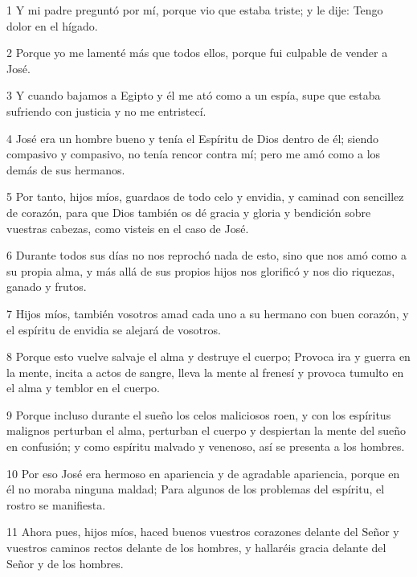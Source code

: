 \par 1 Y mi padre preguntó por mí, porque vio que estaba triste; y le dije: Tengo dolor en el hígado.

\par 2 Porque yo me lamenté más que todos ellos, porque fui culpable de vender a José.

\par 3 Y cuando bajamos a Egipto y él me ató como a un espía, supe que estaba sufriendo con justicia y no me entristecí.

\par 4 José era un hombre bueno y tenía el Espíritu de Dios dentro de él; siendo compasivo y compasivo, no tenía rencor contra mí; pero me amó como a los demás de sus hermanos.

\par 5 Por tanto, hijos míos, guardaos de todo celo y envidia, y caminad con sencillez de corazón, para que Dios también os dé gracia y gloria y bendición sobre vuestras cabezas, como visteis en el caso de José.

\par 6 Durante todos sus días no nos reprochó nada de esto, sino que nos amó como a su propia alma, y ​​más allá de sus propios hijos nos glorificó y nos dio riquezas, ganado y frutos.

\par 7 Hijos míos, también vosotros amad cada uno a su hermano con buen corazón, y el espíritu de envidia se alejará de vosotros.

\par 8 Porque esto vuelve salvaje el alma y destruye el cuerpo; Provoca ira y guerra en la mente, incita a actos de sangre, lleva la mente al frenesí y provoca tumulto en el alma y temblor en el cuerpo.

\par 9 Porque incluso durante el sueño los celos maliciosos roen, y con los espíritus malignos perturban el alma, perturban el cuerpo y despiertan la mente del sueño en confusión; y como espíritu malvado y venenoso, así se presenta a los hombres.

\par 10 Por eso José era hermoso en apariencia y de agradable apariencia, porque en él no moraba ninguna maldad; Para algunos de los problemas del espíritu, el rostro se manifiesta.

\par 11 Ahora pues, hijos míos, haced buenos vuestros corazones delante del Señor y vuestros caminos rectos delante de los hombres, y hallaréis gracia delante del Señor y de los hombres.

